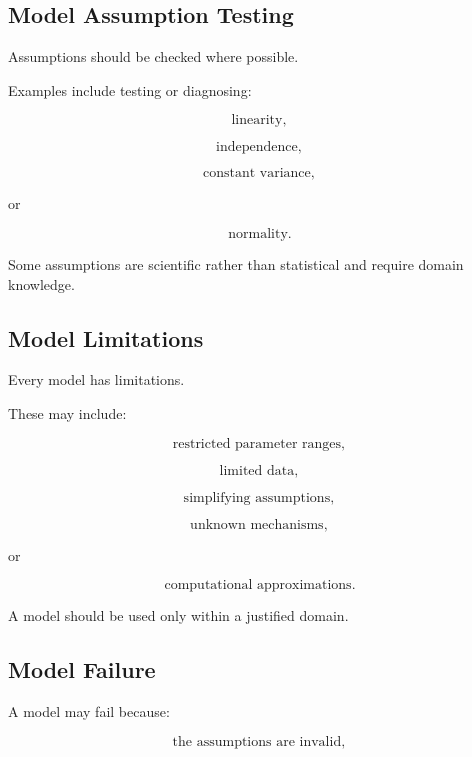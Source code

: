 \subsection{Model Assumption Testing}
\label{subsec:model-assumption-testing}

Assumptions should be checked where possible.

Examples include testing or diagnosing:

\[
\boxed{
\text{linearity},
}
\]

\[
\boxed{
\text{independence},
}
\]

\[
\boxed{
\text{constant variance},
}
\]

or

\[
\boxed{
\text{normality}.
}
\]

Some assumptions are scientific rather than statistical and require domain
knowledge.

\subsection{Model Limitations}
\label{subsec:model-limitations}

Every model has limitations.

These may include:

\[
\boxed{
\text{restricted parameter ranges},
}
\]

\[
\boxed{
\text{limited data},
}
\]

\[
\boxed{
\text{simplifying assumptions},
}
\]

\[
\boxed{
\text{unknown mechanisms},
}
\]

or

\[
\boxed{
\text{computational approximations}.
}
\]

A model should be used only within a justified domain.

\subsection{Model Failure}
\label{subsec:model-failure}

A model may fail because:

\[
\boxed{
\text{the assumptions are invalid},
}
\]

